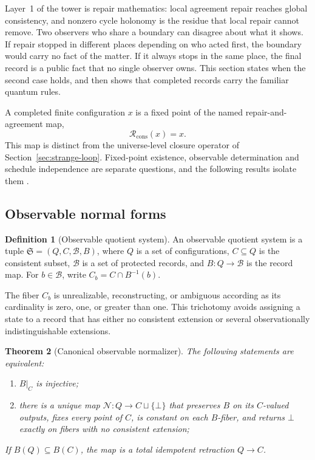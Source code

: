 \documentclass[11pt]{article}
\newtheorem{theorem}{Theorem}[section]
\theoremstyle{definition}
\newtheorem{definition}[theorem]{Definition}
\theoremstyle{remark}
\begin{document}
Layer~1 of the tower is repair mathematics: local agreement repair reaches
global consistency, and nonzero cycle holonomy is the residue that local
repair cannot remove.
Two observers who share a boundary can disagree about what it shows. If
repair stopped in different places depending on who acted first, the
boundary would carry no fact of the matter. If it always stops in the same
place, the final record is a public fact that no single observer owns. This
section states when the second case holds, and then shows that completed
records carry the familiar quantum rules.

A completed finite configuration $x$ is a fixed point of the named
repair-and-agreement map,
\[
\mathcal R_{\mathrm{cons}}(x)=x .
\]
This map is
distinct from the universe-level closure operator of
Section~\ref{sec:strange-loop}. Fixed-point existence, observable
determination and schedule independence are separate questions, and the
following results isolate them \cite{ophnormalforms,ophconsensus}.

\subsection{Observable normal forms}

\begin{definition}[Observable quotient system]
An observable quotient system is a tuple $\mathfrak S=(Q,C,\mathcal B,B)$,
where $Q$ is a set of configurations, $C\subseteq Q$ is the consistent
subset, $\mathcal B$ is a set of protected records, and $B:Q\to\mathcal B$
is the record map. For $b\in\mathcal B$, write $C_b=C\cap B^{-1}(b)$.
\end{definition}

The fiber $C_b$ is unrealizable, reconstructing, or ambiguous according as
its cardinality is zero, one, or greater than one. This trichotomy avoids
assigning a state to a record that has either no consistent extension or
several observationally indistinguishable extensions.

\begin{theorem}[Canonical observable normalizer]
\label{thm:observable-normalizer}
The following statements are equivalent:
\begin{enumerate}[label=(\roman*),leftmargin=1.6em]
\item $B|_C$ is injective;
\item there is a unique map $\mathcal N:Q\to C\sqcup\{\bot\}$ that preserves $B$ on
its $C$-valued outputs, fixes every point of $C$, is constant on each
$B$-fiber, and returns $\bot$ exactly on fibers with no consistent extension;
\end{enumerate}
If $B(Q)\subseteq B(C)$, the map is a total idempotent retraction $Q\to C$.
\end{theorem}
\end{document}
